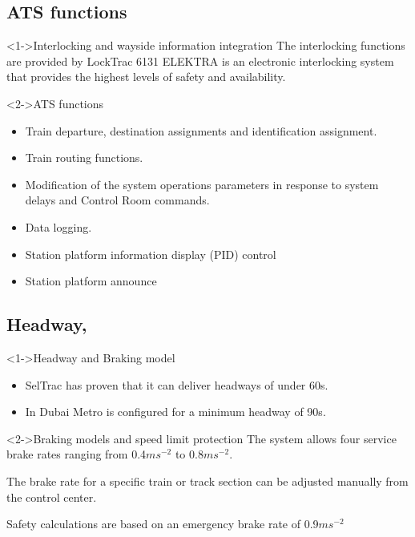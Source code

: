 \subsection{ATS functions}
\frame
{

\begin{block}<1->{Interlocking and wayside information integration}
The interlocking functions are provided by LockTrac 6131 ELEKTRA is an electronic interlocking system that provides the highest levels of safety and availability.


   \end{block}
  
\begin{block}<2->{ATS functions}
\begin{itemize}
\item Train departure, destination assignments and identification assignment.
\item Train routing functions.
\item Modification of the system operations parameters in response to system delays and Control Room commands.
\item Data logging.
\item Station platform information display (PID) control
\item Station platform announce
\end{itemize}
\end{block}
}



\subsection{Headway,  }
\frame
{
  

\begin{block}<1->{Headway and Braking model}
\begin{itemize}
\item SelTrac has proven that it can deliver headways of under 60s. 
\item In Dubai Metro is configured for a minimum headway of 90s.

 
\end{itemize}

   \end{block}
   
   \begin{block}<2->{Braking models and speed limit protection}
The system allows four service brake rates ranging from 0.4$ms^{-2}$ to 0.8$ms^{-2}$.  

The brake rate for a specific train or track section can be adjusted manually from the control center.

Safety calculations are based on an emergency brake rate of 0.9$ms^{-2}$

   \end{block}
   
     }

